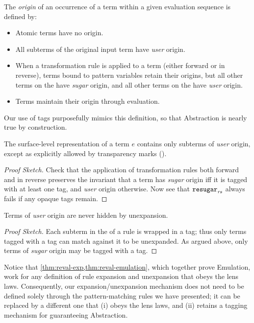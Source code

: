 \begin{definition}
\label{def:reval-origin}
The \emph{origin} of an occurrence of a term within a given evaluation
sequence is defined by:
\begin{itemize}
\item Atomic terms have no origin.
\item All subterms of the original input term have \emph{user} origin.
\item When a transformation rule is applied to a term (either forward or
  in reverse), terms bound to pattern variables retain their origins, but
  all other terms on the  have \emph{sugar} origin, and
  all other terms on the  have \emph{user} origin.
\item Terms maintain their origin through evaluation.
\end{itemize}
\end{definition}

Our use of {\MacBodyf} tags purposefully mimics this definition, so that
Abstraction is nearly true by construction.

\begin{theorem}[Abstraction 1]
\label{thm:reval-abstraction}
The surface-level representation of a term $e$ contains only subterms of
\emph{user} origin, except as explicitly allowed by transparency marks
(\Code{!}).
\end{theorem}
\begin{proof}[Proof Sketch]
Check that the application of transformation rules both forward and in
reverse preserves the invariant that a term has \emph{sugar} origin iff it
is tagged with at least one {\MacBodyf} tag, and \emph{user} origin
otherwise. Now see that $\texttt{resugar}_{\mathit{rs}}$ always fails if any opaque
{\MacBodyf} tags remain.
\end{proof}
\begin{theorem}[Abstraction 2]
Terms of \emph{user} origin are never hidden by unexpansion.
\end{theorem}
\begin{proof}[Proof Sketch]
Each subterm in the  of a rule is wrapped in a {\MacBodyf} tag; thus
only terms tagged with a {\MacBodyf} tag can match against it to be
unexpanded. As argued above, only terms of \emph{sugar} origin may be
tagged with a {\MacBodyf} tag.
\end{proof}

Notice that \cref{thm:reval-exp,thm:reval-emulation}, which together prove
Emulation, work for any definition of rule expansion and unexpansion that
obeys the lens laws. Consequently, our expansion/unexpansion mechanism
does not need to be defined solely through the pattern-matching rules
we have presented; it can be replaced by a different one that
(i) obeys the lens
laws, and (ii) retains a tagging mechanism for guaranteeing Abstraction.


